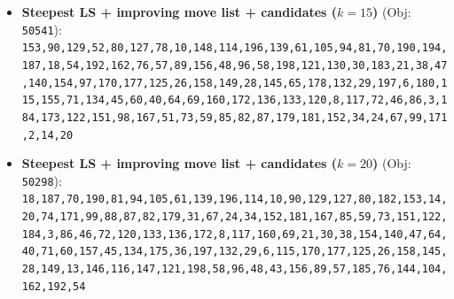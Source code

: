 \begin{itemize}[leftmargin=1.5em]
    \texttt{162,192,54,187,70,81,94,105,61,139,196,114,10,78,127,80,129,90,153,20,14,2,74,171,39,99,88,179,87,82,85,59,51,167,151,3,184,86,46,72,120,133,136,172,160,69,4,64,33,40,60,157,45,134,175,71,155,115,170,6,29,132,178,65,145,28,13,146,149,158,177,125,26,154,140,47,38,21,183,30,191,130,116,147,42,121,198,96,48,156,89,57,185,76,135,34,24,67,66,84}
    \item \textbf{Steepest LS + improving move list + candidates ($k = 15$)} (Obj: \texttt{50541}):\\
    \texttt{153,90,129,52,80,127,78,10,148,114,196,139,61,105,94,81,70,190,194,187,18,54,192,162,76,57,89,156,48,96,58,198,121,130,30,183,21,38,47,140,154,97,170,177,125,26,158,149,28,145,65,178,132,29,197,6,180,115,155,71,134,45,60,40,64,69,160,172,136,133,120,8,117,72,46,86,3,184,173,122,151,98,167,51,73,59,85,82,87,179,181,152,34,24,67,99,171,2,14,20}
    \item \textbf{Steepest LS + improving move list + candidates ($k = 20$)} (Obj: \texttt{50298}):\\
    \texttt{18,187,70,190,81,94,105,61,139,196,114,10,90,129,127,80,182,153,14,20,74,171,99,88,87,82,179,31,67,24,34,152,181,167,85,59,73,151,122,184,3,86,46,72,120,133,136,172,8,117,160,69,21,30,38,154,140,47,64,40,71,60,157,45,134,175,36,197,132,29,6,115,170,177,125,26,158,145,28,149,13,146,116,147,121,198,58,96,48,43,156,89,57,185,76,144,104,162,192,54}
\end{itemize}

